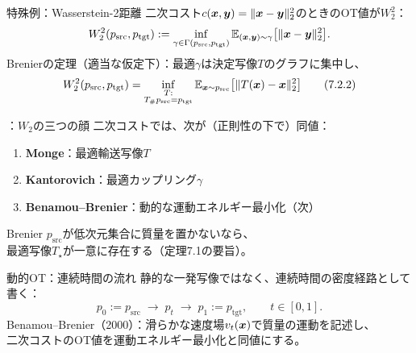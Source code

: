 \asmain
\begin{frame}{特殊例：Wasserstein-2距離}
    二次コスト$c(\bm{x},\bm{y})=\|\bm{x}-\bm{y}\|_{2}^{2}$のときのOT値が$W_{2}^{2}$：
    \[
        W_{2}^{2}(p_{\mathrm{src}},p_{\mathrm{tgt}})
        :=
        \inf_{\gamma\in\Gamma(p_{\mathrm{src}},p_{\mathrm{tgt}})}
        \mathbb{E}_{(\bm{x},\bm{y})\sim\gamma}\bigl[\|\bm{x}-\bm{y}\|_{2}^{2}\bigr].
    \]
    Brenierの定理（適当な仮定下）：最適$\gamma$は決定写像$T$のグラフに集中し、
    \[
        W_{2}^{2}(p_{\mathrm{src}},p_{\mathrm{tgt}})
        =
        \inf_{\substack{T:\\T_{\#}p_{\mathrm{src}}=p_{\mathrm{tgt}}}}
        \mathbb{E}_{\bm{x}\sim p_{\mathrm{src}}}\bigl[\|T(\bm{x})-\bm{x}\|_{2}^{2}\bigr]
        \tag{7.2.2}
    \]
\end{frame}
\assuppl
\begin{frame}{\supplmark：$W_{2}$の三つの顔}
    二次コストでは、次が（正則性の下で）同値：
    \begin{enumerate}
        \item \textbf{Monge}：最適輸送写像$T$
        \item \textbf{Kantorovich}：最適カップリング$\gamma$
        \item \textbf{Benamou--Brenier}：動的な運動エネルギー最小化（次）
    \end{enumerate}
    \begin{exampleblock}{Brenier}
        $p_{\mathrm{src}}$が低次元集合に質量を置かないなら、\\
        最適写像$T_{\star}$が一意に存在する（定理7.1の要旨）。
    \end{exampleblock}
\end{frame}
\asmain
\begin{frame}{動的OT：連続時間の流れ}
    静的な一発写像ではなく、連続時間の密度経路として書く：
    \[
        p_{0}:=p_{\mathrm{src}}
        \;\to\;
        p_{t}
        \;\to\;
        p_{1}:=p_{\mathrm{tgt}},
        \qquad t\in[0,1].
    \]
    Benamou--Brenier（2000）：滑らかな速度場$v_{t}(\bm{x})$で質量の運動を記述し、\\
    二次コストのOT値を運動エネルギー最小化と同値にする。
\end{frame}
\asmain
